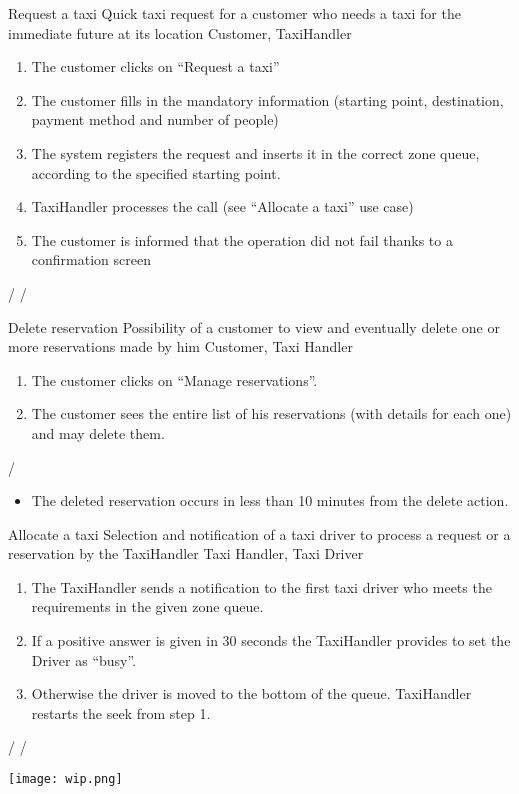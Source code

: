 
\usecase
{Request a taxi}
{Quick taxi request for a customer who needs a taxi for the immediate future at its location}
{Customer, TaxiHandler}
{
\begin{enumerate}
	\item The customer clicks on ``Request a taxi''
	\item The customer fills in the mandatory information (starting point, destination, payment method and number of people)
	\item The system registers the request and inserts it in the correct zone queue, according to the specified starting point.
	\item TaxiHandler processes the call (see ``Allocate a taxi'' use case)
	\item The customer is informed that the operation did not fail thanks to a confirmation screen
\end{enumerate}
}
{
/
}
{ 
/
}

\pagebreak
{}

\usecase
{Delete reservation}
{Possibility of a customer to view and eventually delete one or more reservations made by him}
{Customer, Taxi Handler}
{
\begin{enumerate}
	\item The customer clicks on ``Manage reservations''.
	\item The customer sees the entire list of his reservations (with details for each one) and may delete them.
\end{enumerate}
}
{
/
}
{ 
\begin{itemize}
	\item The deleted reservation occurs in less than 10 minutes from the delete action.
\end{itemize}
}

\pagebreak
{}
\pagebreak
\usecase
{Allocate a taxi}
{Selection and notification of a taxi driver to process a request or a reservation by the TaxiHandler}
{Taxi Handler, Taxi Driver}
{
\begin{enumerate}
	\item The TaxiHandler sends a notification to the first taxi driver who meets the requirements in the given zone queue.
	\item If a positive answer is given in 30 seconds the TaxiHandler provides to set the Driver as ``busy''.
	\item Otherwise the driver is moved to the bottom of the queue. TaxiHandler restarts the seek from step 1.
\end{enumerate}
}
{
/
}
{ 
/
}

\pagebreak
{}

\pagebreak
\texttt{[image: wip.png]}
